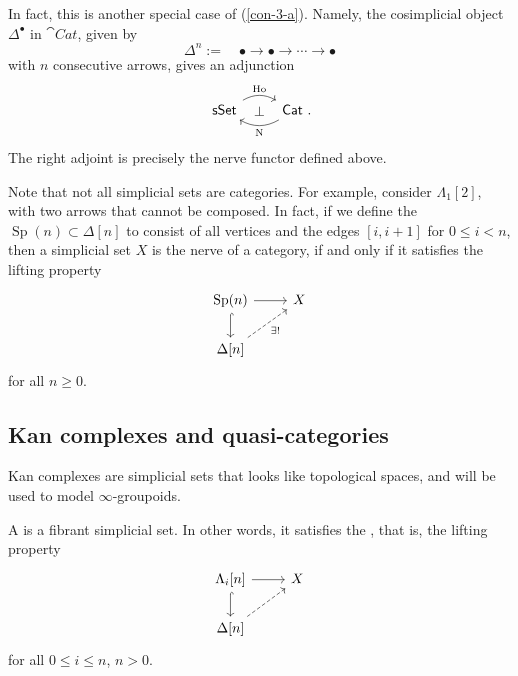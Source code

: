 \begin{remark}
    In fact, this is another special case of (\ref{con-3-a}).
    Namely, the cosimplicial object $\Delta^\bullet$ in $\cat{Cat}$, given by 
    \[\Delta^n:=\quad\bullet\to\bullet\to\cdots\to\bullet\]
    with $n$ consecutive arrows, gives an adjunction
    \[\begin{tikzcd}
        \cat{sSet}\ar[r,bend left=30,"\Ho"]\ar[r,phantom,"\bot"] &
        \rlap{$\cat{Cat}$\ .}\phantom{\cat{sSet}}\ar[l,bend left=30,"\operatorname{N}"]
    \end{tikzcd}\]
    The right adjoint is precisely the nerve functor defined above. \varqed
\end{remark}

Note that not all simplicial sets are categories.
For example, consider $\Lambda_1[2]$, with two arrows that cannot be composed.
In fact, if we define the  $\operatorname{Sp}(n)\subset\Delta[n]$
to consist of all vertices and the edges $[i,i+1]$ for $0\leq i<n$,
then a simplicial set $X$ is the nerve of a category,
if and only if it satisfies the lifting property
\[\begin{tikzcd}
    \operatorname{Sp}(n)\ar[d,hook]\ar[r] & X \\
    \Delta[n]\ar[ur,dashed,"\exists!"']
\end{tikzcd}\]
for all $n\geq 0$.

\subsection{Kan complexes and quasi-categories}

Kan complexes are simplicial sets that looks like topological spaces,
and will be used to model $\infty$-groupoids.

\begin{definition}
    A  is a fibrant simplicial set.
    In other words, it satisfies the ,
    that is, the lifting property
    \[\begin{tikzcd}
        \Lambda_i[n]\ar[d,hook]\ar[r] & X \\
        \Delta[n]\ar[ur,dashed]
    \end{tikzcd}\]
    for all $0\leq i\leq n$, $n>0$.
\end{definition}


